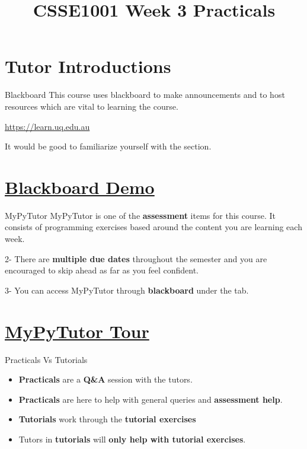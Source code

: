 \documentclass[week3]{csse1001}
\title{CSSE1001 Week 3 Practicals}
\begin{document}
\begin{frame} 
\maketitle
\end{frame}

\section{Tutor Introductions}

\begin{topic}{Blackboard}
This course uses blackboard to make announcements and to host resources which
are vital to learning the course.

\url{https://learn.uq.edu.au}

It would be good to familiarize yourself with the 
section.
\end{topic}

\section{\href{https://learn.uq.edu.au}{Blackboard Demo}}

\begin{topic}{MyPyTutor}
MyPyTutor is one of the \textbf{assessment} items for this course. It consists of
programming exercises based around the content you are learning each week.

\begin{subtopic}{2-}
There are \textbf{multiple due dates} throughout the semester and you are encouraged
to skip ahead as far as you feel confident.
\end{subtopic}

\begin{subtopic}{3-}
You can access MyPyTutor through \textbf{blackboard} under the  tab.
\end{subtopic}
\end{topic}

\section{\href{https://learn.uq.edu.au}{MyPyTutor Tour}}

\begin{topic}{Practicals Vs Tutorials}
\begin{itemize}
	\item \textbf{Practicals} are a \textbf{Q\&A} session with the tutors.
	\item \textbf{Practicals} are here to help with general queries and \textbf{assessment help}.
	\item \textbf{Tutorials} work through the \textbf{tutorial exercises}
	\item Tutors in \textbf{tutorials} will \textbf{only help with tutorial exercises}.
\end{itemize}
\end{topic}
\end{document}

